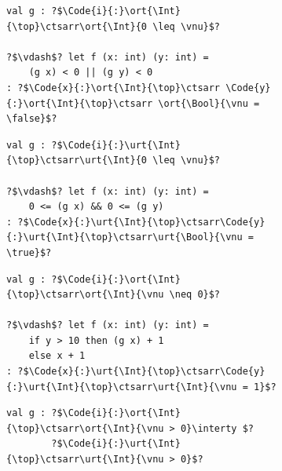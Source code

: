 \begin{figure}[h!]
    \centering
    \begin{subfigure}[t]{0.48\linewidth}
        \centering
\begin{verbatim}
val g : ?$\Code{i}{:}\ort{\Int}{\top}\ctsarr\ort{\Int}{0 \leq \vnu}$?
      
?$\vdash$? let f (x: int) (y: int) = 
    (g x) < 0 || (g y) < 0    
: ?$\Code{x}{:}\ort{\Int}{\top}\ctsarr \Code{y}{:}\ort{\Int}{\top}\ctsarr \ort{\Bool}{\vnu = \false}$?
\end{verbatim}
        \label{fig:may-must-may}
    \end{subfigure}
    \hfill
    \begin{subfigure}[t]{0.48\linewidth}
        \centering
\begin{verbatim}
val g : ?$\Code{i}{:}\urt{\Int}{\top}\ctsarr\urt{\Int}{0 \leq \vnu}$?
        
?$\vdash$? let f (x: int) (y: int) = 
    0 <= (g x) && 0 <= (g y)
: ?$\Code{x}{:}\urt{\Int}{\top}\ctsarr\Code{y}{:}\urt{\Int}{\top}\ctsarr\urt{\Bool}{\vnu = \true}$?
\end{verbatim}
        \label{fig:may-must-must}
    \end{subfigure}

    \medskip

    \begin{subfigure}[t]{0.48\linewidth}
        \centering
\begin{verbatim}
val g : ?$\Code{i}{:}\ort{\Int}{\top}\ctsarr\ort{\Int}{\vnu \neq 0}$?

?$\vdash$? let f (x: int) (y: int) =
    if y > 10 then (g x) + 1
    else x + 1          
: ?$\Code{x}{:}\urt{\Int}{\top}\ctsarr\Code{y}{:}\urt{\Int}{\top}\ctsarr\urt{\Int}{\vnu = 1}$?
\end{verbatim}
        \label{fig:may-must-reach}
    \end{subfigure}
    \hfill
    \begin{subfigure}[t]{0.48\linewidth}
        \centering
\begin{verbatim}
val g : ?$\Code{i}{:}\ort{\Int}{\top}\ctsarr\ort{\Int}{\vnu > 0}\interty $?
        ?$\Code{i}{:}\urt{\Int}{\top}\ctsarr\urt{\Int}{\vnu > 0}$?


\end{verbatim}
\end{subfigure}
\end{figure}
